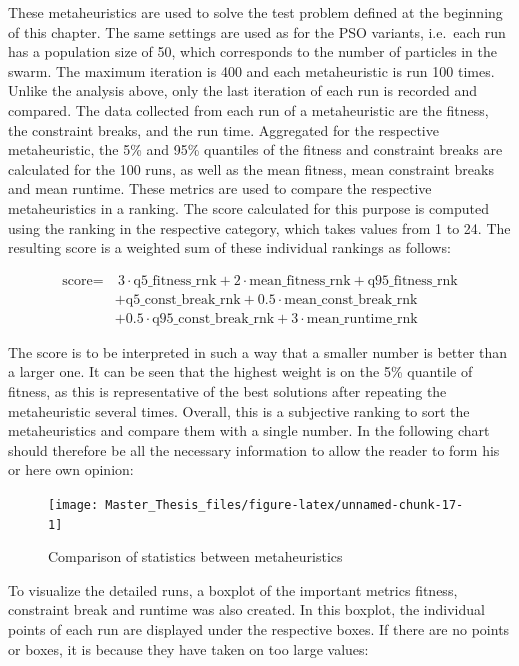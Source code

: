 \documentclass[
  oneside, a4paper, 12pt, openany]{book}
\theoremstyle{definition}
\theoremstyle{definition}
\theoremstyle{definition}
\theoremstyle{definition}
\theoremstyle{remark}
\begin{document}
These metaheuristics are used to solve the test problem defined at the beginning of this chapter. The same settings are used as for the PSO variants, i.e.~each run has a population size of 50, which corresponds to the number of particles in the swarm. The maximum iteration is 400 and each metaheuristic is run 100 times. Unlike the analysis above, only the last iteration of each run is recorded and compared. The data collected from each run of a metaheuristic are the fitness, the constraint breaks, and the run time. Aggregated for the respective metaheuristic, the 5\% and 95\% quantiles of the fitness and constraint breaks are calculated for the 100 runs, as well as the mean fitness, mean constraint breaks and mean runtime. These metrics are used to compare the respective metaheuristics in a ranking. The score calculated for this purpose is computed using the ranking in the respective category, which takes values from 1 to 24. The resulting score is a weighted sum of these individual rankings as follows:

\begin{align*}
\text{score} =& \ 3 \cdot \text{q5\_fitness\_rnk} + 2 \cdot \text{mean\_fitness\_rnk} + \text{q95\_fitness\_rnk}\\ 
&+ \text{q5\_const\_break\_rnk} + 0.5 \cdot \text{mean\_const\_break\_rnk} \\
&+ 0.5 \cdot \text{q95\_const\_break\_rnk} + 3 \cdot \text{mean\_runtime\_rnk}
\end{align*}

The score is to be interpreted in such a way that a smaller number is better than a larger one. It can be seen that the highest weight is on the 5\% quantile of fitness, as this is representative of the best solutions after repeating the metaheuristic several times. Overall, this is a subjective ranking to sort the metaheuristics and compare them with a single number. In the following chart should therefore be all the necessary information to allow the reader to form his or here own opinion:

\begin{figure}[H]
\texttt{[image: Master\_Thesis\_files/figure-latex/unnamed-chunk-17-1]} \caption{Comparison of statistics between metaheuristics}\label{fig:unnamed-chunk-17}
\end{figure}

To visualize the detailed runs, a boxplot of the important metrics fitness, constraint break and runtime was also created. In this boxplot, the individual points of each run are displayed under the respective boxes. If there are no points or boxes, it is because they have taken on too large values:
\end{document}
